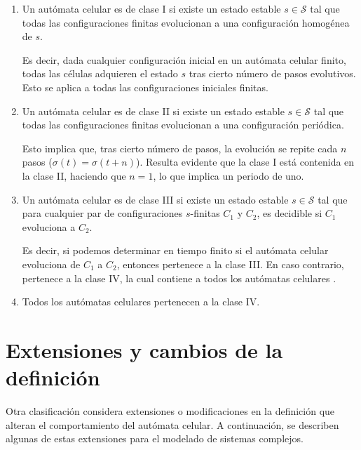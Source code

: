 \begin{enumerate}[label*=CY \Roman*]
	\item Un autómata celular es de clase I si existe un estado estable $s \in \mathcal{S}$ tal que todas las configuraciones finitas evolucionan a una configuración homogénea de $s$.
	
	Es decir, dada cualquier configuración inicial en un autómata celular finito, todas las células adquieren el estado $s$ tras cierto número de pasos evolutivos. Esto se aplica a todas las configuraciones iniciales finitas.
	
	\item Un autómata celular es de clase II si existe un estado estable $s \in \mathcal{S}$ tal que todas las configuraciones finitas evolucionan a una configuración periódica.
	
	Esto implica que, tras cierto número de pasos, la evolución se repite cada $n$ pasos ($\sigma(t) = \sigma(t + n)$). Resulta evidente que la clase I está contenida en la clase II, haciendo que $n = 1$, lo que implica un periodo de uno.
	
	\item Un autómata celular es de clase III si existe un estado estable $s \in \mathcal{S}$ tal que para cualquier par de configuraciones $s$-finitas $C_1$ y $C_2$, es decidible si $C_1$ evoluciona a $C_2$.
	
	Es decir, si podemos determinar en tiempo finito si el autómata celular evoluciona de $C_1$ a $C_2$, entonces pertenece a la clase III. En caso contrario, pertenece a la clase IV, la cual contiene a todos los autómatas celulares \cite{culik1988_class}.
	
	\item Todos los autómatas celulares pertenecen a la clase IV.	
\end{enumerate}


\section{Extensiones y cambios de la definición}

Otra clasificación considera extensiones o modificaciones en la definición que alteran el comportamiento del autómata celular. A continuación, se describen algunas de estas extensiones para el modelado de sistemas complejos. 

